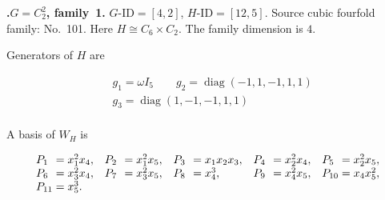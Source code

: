 \documentclass[12pt]{amsart}
\makeatletter
\numberwithin{equation}{section}
\theoremstyle{plain}
\theoremstyle{definition}
\theoremstyle{remark}
\DeclareMathOperator{\diag}{diag}
\newcommand{\PBasisLabel}[1]{\mathrlap{P_{#1}}\phantom{P_{99}}}
\newenvironment{SecEightAlignedBasis}[1]{%
  \begingroup\renewcommand{\arraystretch}{1.18}%
  \[\begin{array}{@{}#1@{}}%
}{\end{array}\]\endgroup}
\newenvironment{familydisplay}{%
  \begingroup
  \setlength{\arraycolsep}{1.35pt}%
  \renewcommand{\arraystretch}{0.96}%
  \setlength{\jot}{2pt}%
}{\endgroup}
\makeatother
\begin{document}
\par{}\medskip\noindent\textbf{.\enspace $G=C_2^2$, family~1.}\label{fam:threefold-no-25}
$G\text{-ID}=[4,2]$, $H\text{-ID}=[12,5]$.
Source cubic fourfold family: No.~101.  Here
$H\cong C_6\times C_2$.
The family dimension is $4$.
\par\smallskip\noindent Generators of $H$ are\par\nopagebreak
\begin{familydisplay}
\begin{align*}
&g_{1}=\omega I_5
\qquad g_{2}=\diag(-1,1,-1,1,1)\\
&g_{3}=\diag(1,-1,-1,1,1)\\
\end{align*}
\end{familydisplay}
\par\smallskip\noindent A basis of $W_H$ is\par\nopagebreak
\begin{familydisplay}
\begin{SecEightAlignedBasis}{l@{\quad}l@{\quad}l@{\quad}l@{\quad}l}
\PBasisLabel{1}=x_{1}^{2}x_{4}, & \PBasisLabel{2}=x_{1}^{2}x_{5}, & \PBasisLabel{3}=x_{1}x_{2}x_{3}, & \PBasisLabel{4}=x_{2}^{2}x_{4}, & \PBasisLabel{5}=x_{2}^{2}x_{5},\\
\PBasisLabel{6}=x_{3}^{2}x_{4}, & \PBasisLabel{7}=x_{3}^{2}x_{5}, & \PBasisLabel{8}=x_{4}^{3}, & \PBasisLabel{9}=x_{4}^{2}x_{5}, & \PBasisLabel{10}=x_{4}x_{5}^{2},\\
\multicolumn{5}{@{}l@{}}{\PBasisLabel{11}=x_{5}^{3}.}
\end{SecEightAlignedBasis}
\end{familydisplay}
\end{document}
